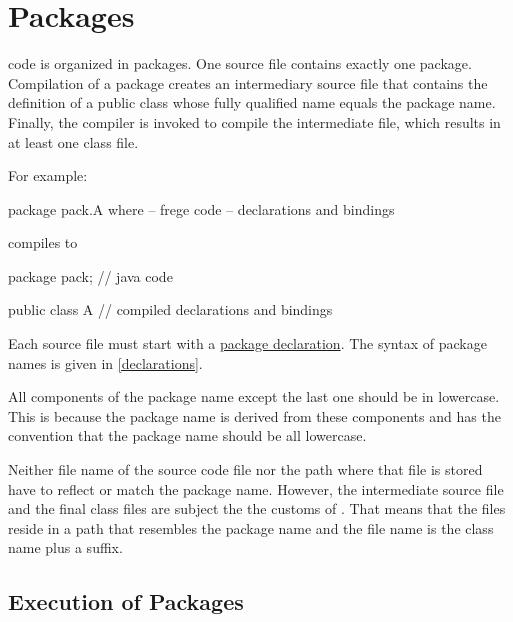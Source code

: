 

\chapter{Packages} \label{packages} 

\frege{} code is organized in packages. One source file contains
exactly one package. Compilation of a package creates an  intermediary \java{}
source file that contains the definition of a public class whose fully qualified name equals the \frege{} package name. Finally, the \java{} compiler is invoked to compile the intermediate file, which results in at least one class file.

For example:

\begin{code}
package pack.A where  -- frege code
-- declarations and bindings
\end{code}

compiles to

\begin{code}
package pack;        // java code

public class A {
    // compiled declarations and bindings
}
\end{code}


Each source file must start with a \hyperref[packagedcl]{package declaration}.
The syntax of package names is given in \autoref{declarations}.

All components of the package name
except the last one should be in lowercase. This is because the \java{}
package name is derived from these components and \java{} has the
convention that the package name should be all lowercase.

Neither file name of the \frege{} source code file nor the path where that file is stored have to reflect or match the package name. However, the intermediate \java{} source file and the final class files are subject the the customs of \java{}. That means that the files reside in a path that resembles the package name and the file name is the class name plus a suffix.

\section{Execution of \frege{} Packages} \label{execution}

